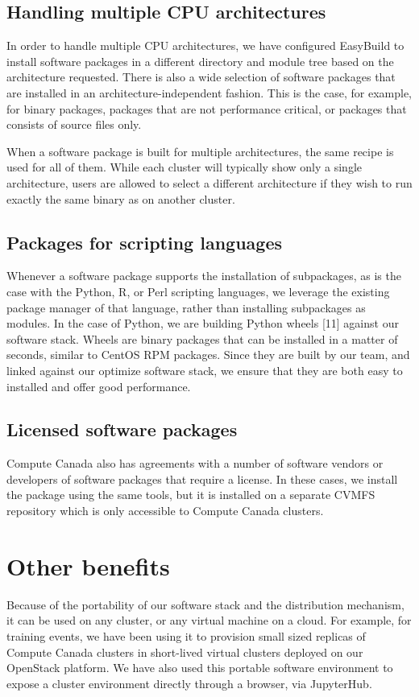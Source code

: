 \documentclass[sigconf]{acmart}
\begin{document}
\subsection{Handling multiple CPU architectures}
In order to handle multiple CPU architectures, we have configured EasyBuild to install software packages in a different directory and module tree based on the architecture requested. There is also a wide selection of software packages that are installed in an architecture-independent fashion. This is the case, for example, for binary packages, packages that are not performance critical, or packages that consists of source files only. 

When a software package is built for multiple architectures, the same recipe is used for all of them. While each cluster will typically show only a single architecture, users are allowed to select a different architecture if they wish to run exactly the same binary as on another cluster. 

\subsection{Packages for scripting languages}
Whenever a software package supports the installation of subpackages, as is the case with the Python, R, or Perl scripting languages, we leverage the existing package manager of that language, rather than installing subpackages as modules. In the case of Python, we are building Python wheels [11] against our software stack. Wheels are binary packages that can be installed in a matter of seconds, similar to CentOS RPM packages. Since they are built by our team, and linked against our optimize software stack, we ensure that they are both easy to installed and offer good performance.


\subsection{Licensed software packages}
Compute Canada also has agreements with a number of software vendors or developers of software packages that require a license. In these cases, we install the package using the same tools, but it is installed on a separate CVMFS repository which is only accessible to Compute Canada clusters.

\section{Other benefits}
Because of the portability of our software stack and the distribution mechanism, it can be used on any cluster, or any virtual machine on a cloud. For example, for training events, we have been using it to provision small sized replicas of Compute Canada clusters in short-lived virtual clusters deployed on our OpenStack platform. We have also used this portable software environment to expose a cluster environment directly through a browser, via JupyterHub. 
\end{document}
